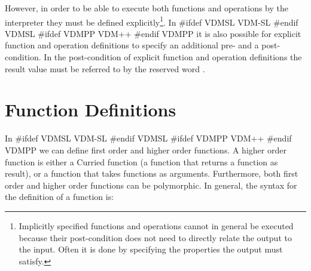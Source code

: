 \documentclass[\pformat,12pt]{article}
\newcommand{\vdmslpp}[2]{%
#ifdef VDMSL
#1
#endif VDMSL
#ifdef VDMPP
#2
#endif VDMPP
}
\newcommand{\vdmpp}{VDM++}
\begin{document}
However, in order to be able to execute both functions and operations
by the interpreter they must be defined explicitly\footnote{Implicitly
specified functions and operations cannot in general be executed
because their post-condition does not need to directly relate the
output to the input. Often it is done by specifying the properties the
output must satisfy.}. In \vdmslpp{ VDM-SL}{\vdmpp} it is also
possible for explicit function and operation definitions to specify an
additional pre- and a post-condition.  In the post-condition of 
explicit function and operation definitions the result value must be
referred to by the reserved word .
 
\section{Function Definitions}\label{functiondef}

In \vdmslpp{ VDM-SL}{\vdmpp} we can define first order and higher order
functions. A higher order function is either a Curried function
(a function that returns a function as result), or a function that takes
functions as arguments. Furthermore, both first order and higher order
functions can be polymorphic. In general, the syntax for the definition of a
function is:






\end{document}
